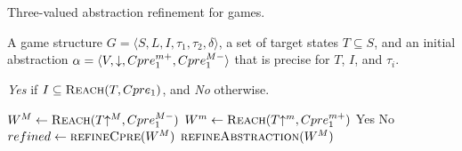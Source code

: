 %

\begin{algorithm}
\caption{Three-valued abstraction refinement for games.}
\label{alg:genericc}

\begin{algorithmic}[1]

     A game structure $G = \langle S, L, I, \tau_1, \tau_2, \delta \rangle$, a set 
    of target states $T\subseteq S$, and an initial abstraction $\alpha=\langle V, \mathord{\downarrow}, Cpre_1^{m+}, Cpre_1^{M-} \rangle$
    that is precise for $T$, $I$, and $\tau_i$.

     {\it Yes} if $I \subseteq \textsc{Reach}(T, Cpre_1)$, and {\it No} otherwise.

    \Loop
        \State $W^M \gets \textsc{Reach}(T\mathord{\uparrow^M}, Cpre_1^{M-})$
        \State $W^m \gets \textsc{Reach}(T\mathord{\uparrow^m}, Cpre_1^{m+})$
            \State\Return Yes
            \State\Return No
        \Else       
            \State $refined \gets \Call{refineCpre}{W^M}$
                \State$\Call{refineAbstraction}{W^M}$
            \EndIf
        \EndIf
    \EndLoop
\end{algorithmic}
\end{algorithm}

